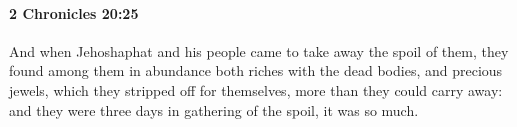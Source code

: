 
		\paragraph{2 Chronicles 20:25} %
			\label{2CHRONICLES-20-25}

			And when Jehoshaphat and his people came to take away the spoil of them, they found among them in abundance both riches with the dead bodies, and precious jewels, which they stripped off for themselves, more than they could carry away: and they were three days in gathering of the spoil, it was so much.


